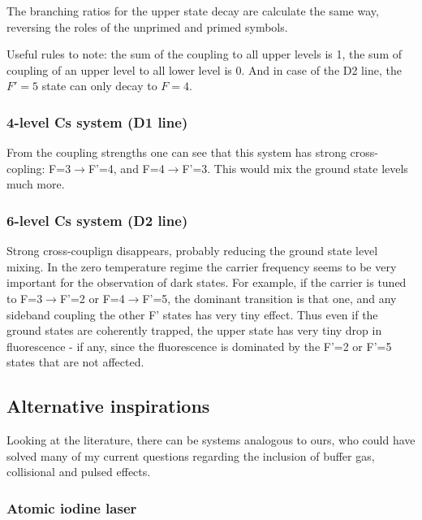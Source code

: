 \documentclass{article}
\begin{document}
\begin{spacing}{1.1}
The branching ratios for the upper state decay are calculate the same way, reversing the roles of the unprimed and primed symbols.

Useful rules to note: the sum of the coupling to all upper levels is 1, the sum of coupling of an upper level to all lower level is 0. And in case of the D2 line, the $F'=5$ state can only decay to $F=4$.


\subsubsection{4-level Cs system (D1 line)}

From the coupling strengths one can see that this system has strong cross-copling: F=3$\rightarrow$F'=4, and F=4$\rightarrow$F'=3. This would mix the ground state levels much more.


\subsubsection{6-level Cs system (D2 line)}

Strong cross-couplign disappears, probably reducing the ground state level mixing. In the zero temperature regime the carrier frequency seems to be  very important for the observation of dark states. For example, if the carrier is tuned to F=3$\rightarrow$F'=2 or F=4$\rightarrow$F'=5, the dominant transition is that one, and any sideband coupling the other F' states has very tiny effect. Thus even if the ground states are coherently trapped, the upper state has very tiny drop in fluorescence - if any, since the fluorescence is dominated by the F'=2 or F'=5 states that are not affected.



\subsection{Alternative inspirations}

Looking at the literature, there can be systems analogous to ours, who could have solved many of my current questions regarding the inclusion of buffer gas, collisional and pulsed effects.

\subsubsection{Atomic iodine laser}


\end{spacing}
\end{document}
